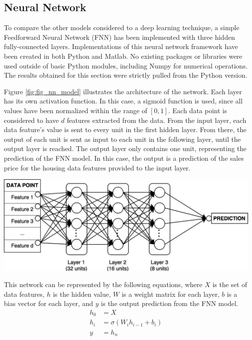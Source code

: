 \documentclass[10pt]{article}
\begin{document}
\begin{multicols}{2}
		\subsection{Neural Network}

		To compare the other models considered to a deep learning technique, a simple Feedforward Neural Network (FNN) has been implemented with three hidden fully-connected layers. Implementations of this neural network framework have been created in both Python and Matlab. No existing packages or libraries were used outside of basic Python modules, including Numpy for numerical operations. The results obtained for this section were strictly pulled from the Python version.
		
		Figure \ref{fig:fig_nn_model} illustrates the architecture of the network. Each layer has its own activation function. In this case, a sigmoid function is used, since all values have been normalized within the range of \([0, 1]\). Each data point is considered to have \(d\) features extracted from the data. From the input layer, each data feature's value is sent to every unit in the first hidden layer. From there, the output of each unit is sent as input to each unit in the following layer, until the output layer is reached. The output layer only contains one unit, representing the prediction of the FNN model. In this case, the output is a prediction of the sales price for the housing data features provided to the input layer.
		
		\begin{center}
            \captionsetup{type=figure}
			\includegraphics[scale=0.15]{NeuralNet/fig_nn_01} \\
			\label{fig:fig_nn_model}
		\end{center}
	
		This network can be represented by the following equations, where \(X\) is the set of data features, \(h\) is the hidden value, \(W\) is a weight matrix for each layer, \(b\) is a bias vector for each layer, and \(y\) is the output prediction from the FNN model.
		\begin{align}
			h_{0} &= X \nonumber \\
			h_{i} &= \sigma(W_{i}h_{i-1} + b_{i}) \nonumber \\
			y &= h_{n} \nonumber
		\end{align}
	

\end{multicols}
\end{document}
